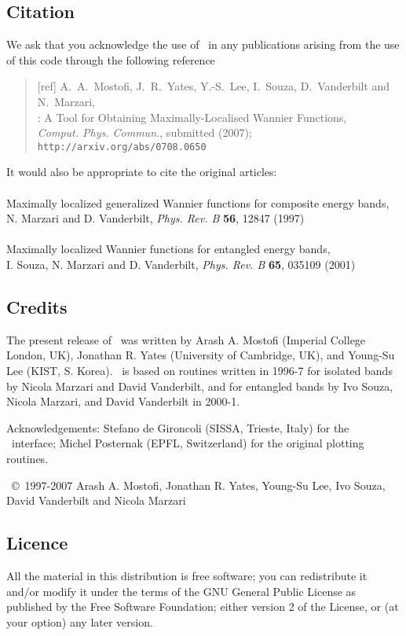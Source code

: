 \subsection{Citation}
We ask that you acknowledge the use of \wannier\ in any publications
arising from the use of this code through the following reference
\begin{quote}
[ref] A.~A.~Mostofi, J.~R.~Yates, Y.-S.~Lee, I.~Souza, D.~Vanderbilt
and N.~Marzari,\\
\wannier: A Tool for Obtaining Maximally-Localised Wannier
  Functions,\\ {\it Comput. Phys. Commun.}, submitted (2007); {\tt
  http://arxiv.org/abs/0708.0650}

\end{quote}                                                              

It would also be appropriate to cite the original articles:\\\\
Maximally localized generalized Wannier functions for composite
  energy bands,\\ 
N. Marzari and D. Vanderbilt, {\it Phys. Rev. B} {\bf 56}, 12847 (1997)\\\\
Maximally localized Wannier functions for entangled energy bands,\\
I. Souza, N. Marzari and D. Vanderbilt, {\it Phys. Rev. B} {\bf 65}, 035109 (2001)


\subsection{Credits}
The present release of \wannier\ was written by Arash A. Mostofi
(Imperial College London, UK), Jonathan R. Yates (University of
Cambridge, UK), and Young-Su Lee (KIST, S. Korea). \wannier\ is
based on routines written in 1996-7 for isolated bands by Nicola Marzari
and David Vanderbilt, and for entangled bands by Ivo Souza, Nicola Marzari,
and David Vanderbilt in 2000-1.

Acknowledgements: Stefano de Gironcoli (SISSA, Trieste, Italy) for the
\pwscf\ interface; Michel Posternak (EPFL, Switzerland) for the
original plotting routines. 

\wannier\ \copyright\ 1997-2007 Arash A. Mostofi, Jonathan R. Yates,
Young-Su Lee, Ivo Souza, David Vanderbilt and Nicola Marzari

\subsection{Licence}
All the material in this distribution is free software; you can
redistribute it and/or 
modify it under the terms of the GNU General Public License
as published by the Free Software Foundation; either version 2
of the License, or (at your option) any later version.

